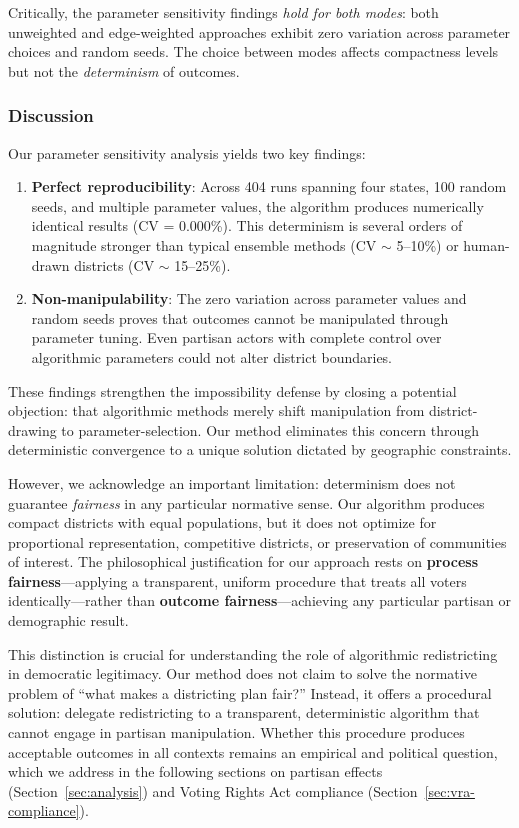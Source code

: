 Critically, the parameter sensitivity findings \textit{hold for both modes}: both unweighted and edge-weighted approaches exhibit zero variation across parameter choices and random seeds. The choice between modes affects compactness levels but not the \textit{determinism} of outcomes.

\subsubsection{Discussion}
\label{sec:sensitivity-discussion}

Our parameter sensitivity analysis yields two key findings:

\begin{enumerate}
    \item \textbf{Perfect reproducibility}: Across 404 runs spanning four states, 100 random seeds, and multiple parameter values, the algorithm produces numerically identical results (CV = 0.000\%). This determinism is several orders of magnitude stronger than typical ensemble methods (CV $\sim$ 5--10\%) or human-drawn districts (CV $\sim$ 15--25\%).

    \item \textbf{Non-manipulability}: The zero variation across parameter values and random seeds proves that outcomes cannot be manipulated through parameter tuning. Even partisan actors with complete control over algorithmic parameters could not alter district boundaries.
\end{enumerate}

These findings strengthen the impossibility defense by closing a potential objection: that algorithmic methods merely shift manipulation from district-drawing to parameter-selection. Our method eliminates this concern through deterministic convergence to a unique solution dictated by geographic constraints.

However, we acknowledge an important limitation: determinism does not guarantee \textit{fairness} in any particular normative sense. Our algorithm produces compact districts with equal populations, but it does not optimize for proportional representation, competitive districts, or preservation of communities of interest. The philosophical justification for our approach rests on \textbf{process fairness}---applying a transparent, uniform procedure that treats all voters identically---rather than \textbf{outcome fairness}---achieving any particular partisan or demographic result.

This distinction is crucial for understanding the role of algorithmic redistricting in democratic legitimacy. Our method does not claim to solve the normative problem of ``what makes a districting plan fair?'' Instead, it offers a procedural solution: delegate redistricting to a transparent, deterministic algorithm that cannot engage in partisan manipulation. Whether this procedure produces acceptable outcomes in all contexts remains an empirical and political question, which we address in the following sections on partisan effects (Section~\ref{sec:analysis}) and Voting Rights Act compliance (Section~\ref{sec:vra-compliance}).
